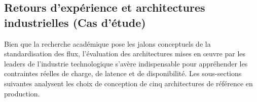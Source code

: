 \vspace{0.5cm}

\subsection{Retours d'expérience et architectures industrielles (Cas d'étude)}
\label{subsec:retours_experience_indus}

Bien que la recherche académique pose les jalons conceptuels de la standardisation des flux, l'évaluation des architectures mises en œuvre par les leaders de l'industrie technologique s'avère indispensable pour appréhender les contraintes réelles de charge, de latence et de disponibilité. Les sous-sections suivantes analysent les choix de conception de cinq architectures de référence en production.



